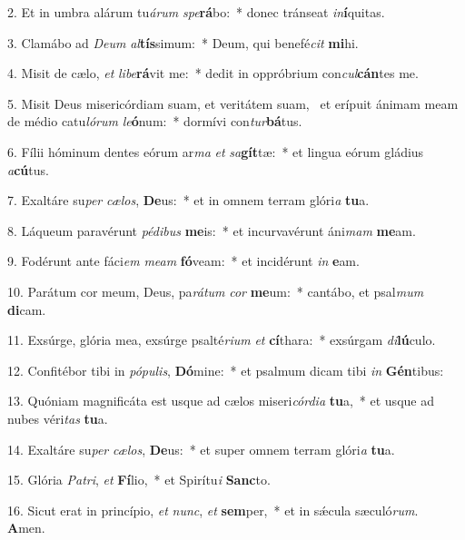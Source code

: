 2. Et in umbra alárum tu\textit{á}\textit{rum} \textit{spe}\textbf{rá}bo:~*  donec tránseat \textit{in}\textbf{í}quitas.\

3. Clamábo ad \textit{De}\textit{um} \textit{al}\textbf{tís}simum:~*  Deum, qui benefé\textit{cit} \textbf{mi}hi.\

4. Misit de cælo, \textit{et} \textit{li}\textit{be}\textbf{rá}vit me:~*  dedit in oppróbrium con\textit{cul}\textbf{cán}tes me.\

5. Misit Deus misericórdiam suam, et veritátem suam, \dag\  et erípuit ánimam meam de médio catu\textit{ló}\textit{rum} \textit{le}\textbf{ó}num:~*  dormívi con\textit{tur}\textbf{bá}tus.\

6. Fílii hóminum dentes eórum ar\textit{ma} \textit{et} \textit{sa}\textbf{gít}tæ:~*  et lingua eórum gládius \textit{a}\textbf{cú}tus.\

7. Exaltáre su\textit{per} \textit{cæ}\textit{los}, \textbf{De}us:~*  et in omnem terram glóri\textit{a} \textbf{tu}a.\

8. Láqueum paravérunt \textit{pé}\textit{di}\textit{bus} \textbf{me}is:~*  et incurvavérunt áni\textit{mam} \textbf{me}am.\

9. Fodérunt ante fáci\textit{em} \textit{me}\textit{am} \textbf{fó}veam:~*  et incidérunt \textit{in} \textbf{e}am.\

10. Parátum cor meum, Deus, pa\textit{rá}\textit{tum} \textit{cor} \textbf{me}um:~*  cantábo, et psal\textit{mum} \textbf{di}cam.\

11. Exsúrge, glória mea, exsúrge psalté\textit{ri}\textit{um} \textit{et} \textbf{cí}thara:~*  exsúrgam \textit{di}\textbf{lú}culo.\

12. Confitébor tibi in \textit{pó}\textit{pu}\textit{lis}, \textbf{Dó}mine:~*  et psalmum dicam tibi \textit{in} \textbf{Gén}tibus:\

13. Quóniam magnificáta est usque ad cælos miseri\textit{cór}\textit{di}\textit{a} \textbf{tu}a,~*  et usque ad nubes véri\textit{tas} \textbf{tu}a.\

14. Exaltáre su\textit{per} \textit{cæ}\textit{los}, \textbf{De}us:~*  et super omnem terram glóri\textit{a} \textbf{tu}a.\

15. Glória \textit{Pa}\textit{tri}, \textit{et} \textbf{Fí}lio,~*  et Spirítu\textit{i} \textbf{Sanc}to.\

16. Sicut erat in princípio, \textit{et} \textit{nunc}, \textit{et} \textbf{sem}per,~*  et in sǽcula sæculó\textit{rum}. \textbf{A}men.\


